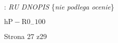 \documentclass[a4paper,12pt]{article}
\begin{document}
: {\it RU DNOPIS} \{{\it nie podlega ocenie}\}

$\mathrm{h}\mathrm{P}-\mathrm{R}0_{-}100$

Strona 27 z29
\end{document}

